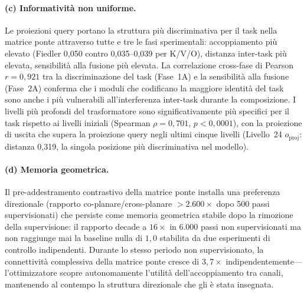 \documentclass[11pt]{article}
\begin{document}
\paragraph{(c) Informativit\`a non uniforme.}
Le proiezioni query portano la struttura pi\`u discriminativa per il task
nella matrice ponte attraverso tutte e tre le fasi sperimentali:
accoppiamento pi\`u elevato (Fiedler 0,050 contro 0,035--0,039 per K/V/O),
distanza inter-task pi\`u elevata, sensibilit\`a alla fusione pi\`u
elevata.
La correlazione cross-fase di Pearson $r = 0{,}921$ tra la
discriminazione del task (Fase~1A) e la sensibilit\`a alla fusione
(Fase~2A) conferma che i moduli che codificano la maggiore identit\`a
del task sono anche i pi\`u vulnerabili all'interferenza inter-task
durante la composizione.
I livelli pi\`u profondi del trasformatore sono significativamente pi\`u
specifici per il task rispetto ai livelli iniziali (Spearman
$\rho = 0{,}701$, $p < 0{,}0001$), con la proiezione di uscita che
supera la proiezione query negli ultimi cinque livelli (Livello~24
$o_\text{proj}$: distanza 0,319, la singola posizione pi\`u
discriminativa nel modello).

\paragraph{(d) Memoria geometrica.}
Il pre-addestramento contrastivo della matrice ponte installa una
preferenza direzionale (rapporto co-planare/cross-planare
$> 2.600\times$ dopo 500 passi supervisionati) che persiste come
memoria geometrica stabile dopo la rimozione della supervisione:
il rapporto decade a $16\times$ in 6.000 passi non supervisionati
ma non raggiunge mai la baseline nulla di $1{,}0$ stabilita da due
esperimenti di controllo indipendenti. Durante lo stesso periodo non
supervisionato, la connettivit\`a complessiva della matrice ponte
cresce di $3{,}7\times$ indipendentemente---l'ottimizzatore scopre
autonomamente l'utilit\`a dell'accoppiamento tra canali, mantenendo
al contempo la struttura direzionale che gli \`e stata insegnata.
\end{document}

